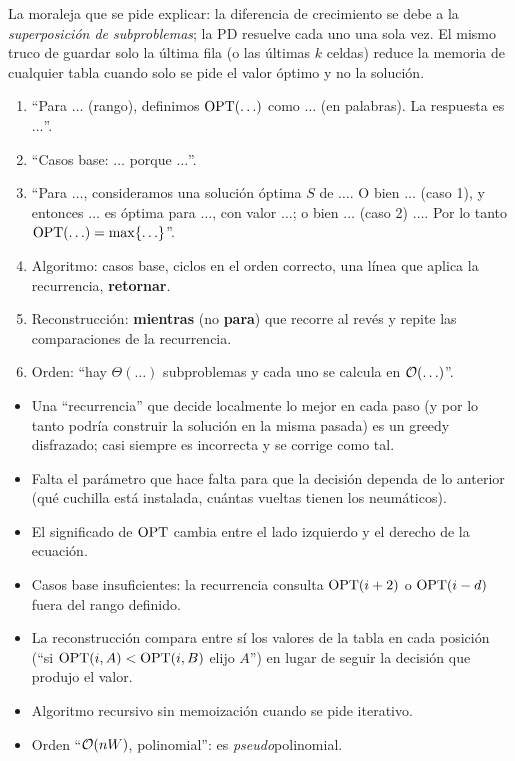 La moraleja que se pide explicar: la diferencia de crecimiento se debe a la
\emph{superposición de subproblemas}; la PD resuelve cada uno una sola vez.
El mismo truco de guardar solo la última fila (o las últimas $k$ celdas)
reduce la memoria de cualquier tabla cuando solo se pide el valor óptimo y
no la solución.

\begin{receta}
\begin{enumerate}[leftmargin=1.2em]
  \item ``Para $\ldots$ (rango), definimos $\mathrm{OPT}(\ldots)$ como $\ldots$ (en
  palabras). La respuesta es $\ldots$''.
  \item ``Casos base: $\ldots$ porque $\ldots$''.
  \item ``Para $\ldots$, consideramos una solución óptima $S$ de $\ldots$.
  O bien $\ldots$ (caso 1), y entonces $\ldots$ es óptima para $\ldots$, con
  valor $\ldots$; o bien $\ldots$ (caso 2) $\ldots$. Por lo tanto
  $\mathrm{OPT}(\ldots)=\max\{\ldots\}$''.
  \item Algoritmo: casos base, ciclos en el orden correcto, una línea que
  aplica la recurrencia, \textbf{retornar}.
  \item Reconstrucción: \textbf{mientras} (no \textbf{para}) que recorre al
  revés y repite las comparaciones de la recurrencia.
  \item Orden: ``hay $\Theta(\ldots)$ subproblemas y cada uno se calcula en
  $\mathcal{O}(\ldots)$''.
\end{enumerate}
\end{receta}

\begin{trampa}
\begin{itemize}[leftmargin=1.2em]
  \item Una ``recurrencia'' que decide localmente lo mejor en cada paso (y
  por lo tanto podría construir la solución en la misma pasada) es un
  greedy disfrazado; casi siempre es incorrecta y se corrige como tal.
  \item Falta el parámetro que hace falta para que la decisión dependa de lo
  anterior (qué cuchilla está instalada, cuántas vueltas tienen los
  neumáticos).
  \item El significado de $\mathrm{OPT}$ cambia entre el lado izquierdo y el derecho
  de la ecuación.
  \item Casos base insuficientes: la recurrencia consulta $\mathrm{OPT}(i+2)$ o
  $\mathrm{OPT}(i-d)$ fuera del rango definido.
  \item La reconstrucción compara entre sí los valores de la tabla en cada
  posición (``si $\mathrm{OPT}(i,A)<\mathrm{OPT}(i,B)$ elijo $A$'') en lugar de seguir la
  decisión que produjo el valor.
  \item Algoritmo recursivo sin memoización cuando se pide iterativo.
  \item Orden ``$\mathcal{O}(nW)$, polinomial'': es \emph{pseudo}polinomial.
\end{itemize}
\end{trampa}

